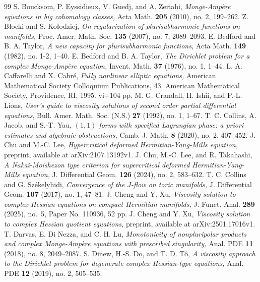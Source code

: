 \documentclass[10pt,a4paper]{amsart}
\numberwithin{equation}{section}
\begin{document}
\begin{thebibliography}{99}
 S. Boucksom, P. Eyssidieux, V. Guedj, and A. Zeriahi, \textit{Monge-Amp{\`e}re equations in big cohomology classes,} Acta Math. \textbf{205} (2010), no. 2, 199--262.
 Z. Błocki and S. Kołodziej, \textit{On regularization of plurisubharmonic functions on manifolds,} Proc. Amer. Math. Soc. \textbf{135} (2007), no. 7, 2089--2093.
 E. Bedford and B. A. Taylor, \textit{A new capacity for plurisubharmonic functions,} Acta Math. \textbf{149} (1982), no. 1-2, 1--40.
 E. Bedford and B. A. Taylor, \textit{The Dirichlet problem for a complex Monge-Ampère equation,} Invent. Math. \textbf{37} (1976), no. 1, 1--44.
 L. A. Caffarelli and X. Cabré, \textit{Fully nonlinear elliptic equations,} American Mathematical Society Colloquium Publications, 43. American Mathematical Society, Providence, RI, 1995. {\rm vi}+104 pp.
 M. G. Crandall, H. Ishii, and P.-L. Lions, \textit{User's guide to viscosity solutions of second order partial differential equations}, Bull. Amer. Math. Soc. (N.S.) \textbf{27} (1992), no. 1, 1--67.
 T. C. Collins, A. Jacob, and S.-T. Yau, \textit{$(1,1)$ forms with specified Lagrangian phase: a priori estimates and algebraic obstructions,} Camb. J. Math. \textbf{8} (2020), no. 2, 407--452.
 J. Chu and M.-C. Lee, \textit{Hypercritical deformed Hermitian-Yang-Mills equation,} preprint, available at arXiv:2107.13192v1.
 J. Chu, M.-C. Lee, and R. Takahashi, \textit{A Nakai-Moishezon type criterion for supercritical deformed Hermitian-Yang-Mills equation,} J. Differential Geom. \textbf{126} (2024), no. 2, 583--632.
 T. C. Collins and G. Sz{\'e}kelyhidi, \textit{Convergence of the $J$-flow on toric manifolds,} J. Differential Geom. \textbf{107} (2017), no. 1, 47--81.
 J. Cheng and Y. Xu, \textit{Viscosity solution to complex Hessian equations on compact Hermitian manifolds,} J. Funct. Anal. {\bf 289} (2025), no.~5, Paper No. 110936, 52 pp.
 J. Cheng and Y. Xu, \textit{Viscosity solution to complex Hessian quotient equations,} preprint, available at arXiv:2501.17016v1.
 T. Darvas, E. Di Nezza, and C. H. Lu, \textit{Monotonicity of nonpluripolar products and complex Monge-Ampère equations with prescribed singularity,} Anal. PDE \textbf{11} (2018), no. 8, 2049--2087.
 S. Dinew, H.-S. Do, and T. D. T{\^o}, \textit{A viscosity approach to the Dirichlet problem for degenerate complex Hessian-type equations,} Anal. PDE \textbf{12} (2019), no. 2, 505--535.

\end{thebibliography}
\end{document}
